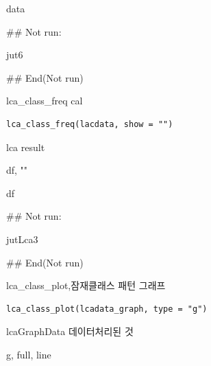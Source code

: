 \documentclass[a4paper]{book}
\begin{document}
%
\begin{Value}
data
\end{Value}
%
\begin{Examples}
\begin{ExampleCode}
\#\# Not run: 

jut6 %

## End(Not run)
\end{ExampleCode}
\end{Examples}
%
\begin{Description}
lca\_class\_freq cal
\end{Description}
%
\begin{Usage}
\begin{verbatim}
lca_class_freq(lacdata, show = "")
\end{verbatim}
\end{Usage}
%
\begin{Arguments}
\begin{ldescription}
\item[\code{lacdata}] lca result

\item[\code{show}] df, ""
\end{ldescription}
\end{Arguments}
%
\begin{Value}
df
\end{Value}
%
\begin{Examples}
\begin{ExampleCode}
\#\# Not run: 

 jutLca3 %

## End(Not run)
\end{ExampleCode}
\end{Examples}
%
\begin{Description}
lca\_class\_plot,잠재클래스 패턴 그래프
\end{Description}
%
\begin{Usage}
\begin{verbatim}
lca_class_plot(lcadata_graph, type = "g")
\end{verbatim}
\end{Usage}
%
\begin{Arguments}
\begin{ldescription}
\item[\code{lcadata\_graph}] lcaGraphData 데이터처리된 것

\item[\code{type}] g, full, line
\end{ldescription}
\end{Arguments}
\end{document}
